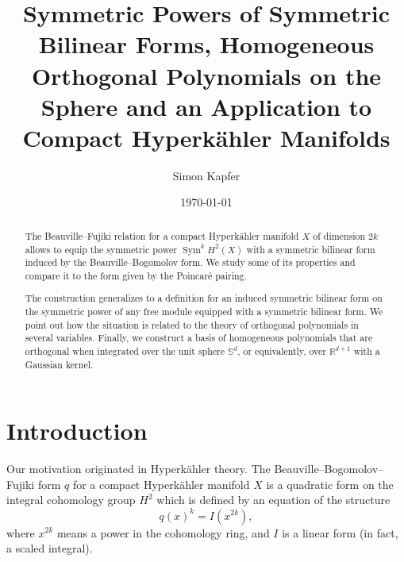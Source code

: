 \documentclass{amsart}
\DeclareMathOperator{\Sym}{Sym}
\newcommand{\R}{\mathbb{R}}
\renewcommand{\S}{\mathbb{S}}
\theoremstyle{plain}
\theoremstyle{definition}
\theoremstyle{remark}
\begin{document}
\title[Symmetric Powers, Hom.~Orth.~Polynomials, Hyperk\"ahlers]{Symmetric Powers of Symmetric Bilinear Forms, Homogeneous Orthogonal Polynomials on the Sphere and an Application to Compact Hyperk\"ahler Manifolds}


\author{Simon Kapfer}
\address{Simon Kapfer, Laboratoire de Math\'ematiques et Applications, UMR CNRS 6086, Universit\'e de Poitiers, T\'el\'eport 2, Boulevard Marie et Pierre Curie, F-86962 Futuroscope Chasseneuil}


\date{\today}


\begin{abstract} The Beauville--Fujiki relation for a compact Hyperk\"ahler manifold $X$ of dimension $2k$ allows to equip the symmetric power $\Sym^kH^2(X)$ with a symmetric bilinear form induced by the Beauville--Bogomolov form. We study some of its properties and compare it to the form given by the Poincar\'e pairing.

The construction generalizes to a definition for an induced symmetric bilinear form on the symmetric power of any free module equipped with a symmetric bilinear form. We point out how the situation is related to the theory of orthogonal polynomials in several variables.
Finally, we construct a basis of homogeneous polynomials that are orthogonal when integrated over the unit sphere $\S^d$, or equivalently, over $\R^{d+1}$ with a Gaussian kernel.
\end{abstract}

\maketitle


\section{Introduction}
Our motivation originated in Hyperk\"ahler theory. The Beauville--Bogomolov--Fujiki form $q$ for a compact Hyperk\"ahler manifold $X$ is a quadratic form on the integral cohomology group $H^2$ which is defined by an equation of the structure
\begin{equation} \label{initialeq}
q(x)^k = I(x^{2k}),
\end{equation}
where $x^{2k}$ means a power in the cohomology ring, and $I$ is a linear form (in fact, a scaled integral). 
\end{document}

